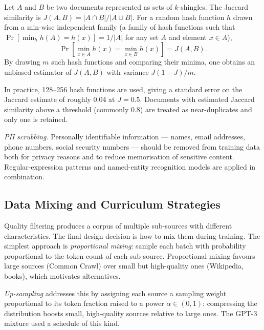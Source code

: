 \begin{context}
\begin{definition}
\label{def:minhash}
Let $A$ and $B$ be two documents represented as sets of $k$-shingles.
The Jaccard similarity is $J(A, B) = |A \cap B| / |A \cup B|$.
For a random hash function $h$ drawn from a min-wise independent family (a family of hash functions such that $\Pr[\min_h h(A) = h(x)] = 1/|A|$ for any set $A$ and element $x \in A$),
\begin{equation}
  \Pr\!\left[\min_{x \in A} h(x) = \min_{x \in B} h(x)\right] = J(A, B).
  \label{eq:minhash}
\end{equation}
By drawing $m$ such hash functions and comparing their minima, one obtains
an unbiased estimator of $J(A, B)$ with variance $J(1-J)/m$.
\end{definition}

In practice, 128--256 hash functions are used, giving a standard error on
the Jaccard estimate of roughly 0.04 at $J = 0.5$.  Documents with
estimated Jaccard similarity above a threshold (commonly 0.8) are treated
as near-duplicates and only one is retained.

\emph{PII scrubbing.}  Personally identifiable information --- names, email
addresses, phone numbers, social security numbers --- should be removed from
training data both for privacy reasons and to reduce memorisation of sensitive
content.  Regular-expression patterns and named-entity recognition models are
applied in combination.

\subsection{Data Mixing and Curriculum Strategies}
\label{subsec:data-mixing}

Quality filtering produces a corpus of multiple sub-sources with different
characteristics.  The final design decision is how to mix them during training.
The simplest approach is \emph{proportional mixing}: sample each batch with
probability proportional to the token count of each sub-source.  Proportional
mixing favours large sources (Common Crawl) over small but high-quality ones
(Wikipedia, books), which motivates alternatives.

\emph{Up-sampling} addresses this by assigning each source a sampling weight
proportional to its token fraction raised to a power $\alpha \in (0,1)$:
compressing the distribution boosts small, high-quality sources relative to
large ones.  The GPT-3 mixture used a schedule of this kind.


\end{context}
